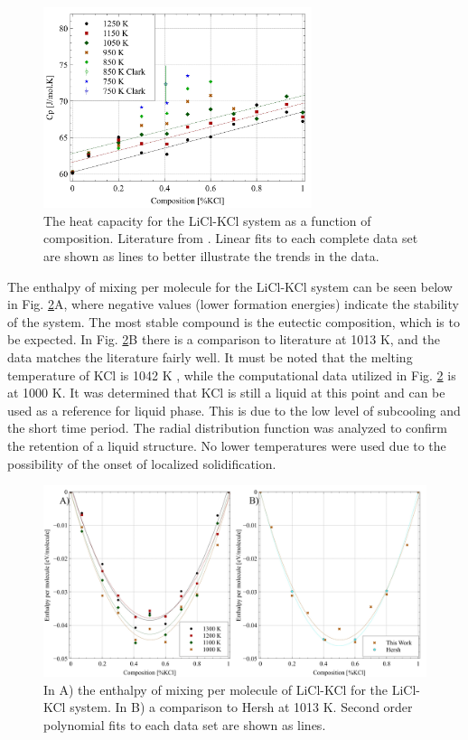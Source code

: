 \documentclass[review]{elsarticle}
\begin{document}
\begin{figure}[h]
 \centering
 \includegraphics[width=0.7\textwidth]{images/cp.jpg} 
 \caption{The heat capacity for the LiCl-KCl system as a function of composition. Literature from \cite{janz1975molten,clark1973}. Linear fits to each complete data set are shown as lines to better illustrate the trends in the data. }
 \label{fig:cp}   
\end{figure} 

\FloatBarrier

The enthalpy of mixing per molecule for the LiCl-KCl system can be seen below in Fig. \ref{fig:enthalpy}A, where negative values (lower formation energies) indicate the stability of the system. The most stable compound is the eutectic composition, which is to be expected. In Fig. \ref{fig:enthalpy}B there is a comparison to literature \cite{hersh1965enthalpies} at 1013 K, and the data matches the literature fairly well. It must be noted that the melting temperature of KCl is 1042 K \cite{Zhou2020}, while the computational data utilized in Fig. \ref{fig:enthalpy} is at 1000 K. It was determined that KCl is still a liquid at this point and can be used as a reference for liquid phase. This is due to the low level of subcooling and the short time period. The radial distribution function was analyzed to confirm the retention of a liquid structure. No lower temperatures were used due to the possibility of the onset of localized solidification.

\begin{figure}[h]
 \centering
 \includegraphics[width=1.0\textwidth]{images/enthalpy_combined.jpg} 
 \caption{In A) the enthalpy of mixing per molecule of LiCl-KCl for the LiCl-KCl system. In B)  a comparison to Hersh \cite{hersh1965enthalpies} at 1013 K. Second order polynomial fits to each data set are shown as lines.}
 \label{fig:enthalpy}
\end{figure} 
\end{document}
